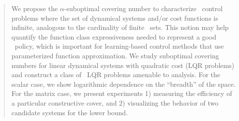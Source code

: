 \begin{abstract}
	We propose the $\alpha$-suboptimal covering number
	to characterize \multienv\ control problems
	where the set of dynamical systems and/or cost functions is infinite,
	analogous to the cardinality of finite \envword\ sets.
	This notion may help quantify
	the function class expressiveness
	needed to represent a good \multienv\ policy,
	which is important for learning-based control methods that use parameterized function approximation.
	We study suboptimal covering numbers for
	linear dynamical systems with quadratic cost (LQR problems)
	and construct a class of \multienv\ LQR problems amenable to analysis.
	For the scalar case, we show logarithmic dependence on the ``breadth'' of the space.
	For the matrix case, we present experiments
	1) measuring the efficiency of a particular constructive cover, and
	2) visualizing the behavior of two candidate systems for the lower bound.%
\end{abstract}
